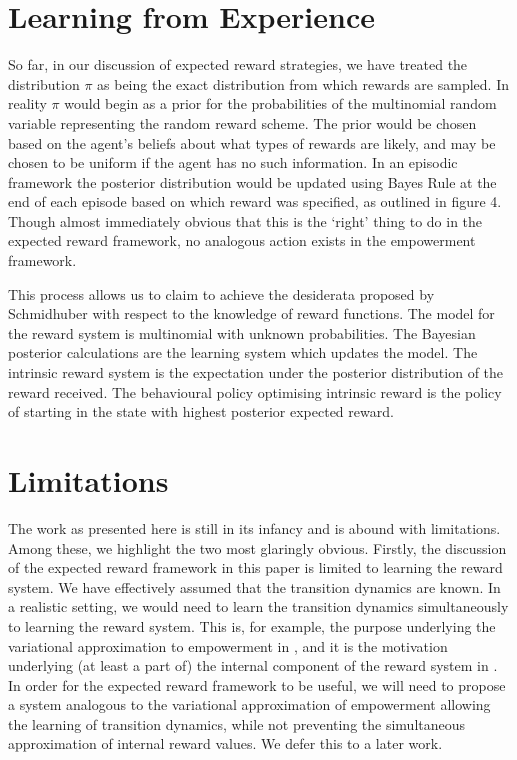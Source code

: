 \documentclass{article}
\begin{document}
\section{Learning from Experience}
So far, in our discussion of expected reward strategies, we have treated the distribution $\pi$ as being the exact distribution from which rewards are sampled. In reality $\pi$ would begin as a prior for the probabilities of the multinomial random variable representing the random reward scheme. The prior would be chosen based on the agent's beliefs about what types of rewards are likely, and may be chosen to be uniform if the agent has no such information. In an episodic framework the posterior distribution would be updated using Bayes Rule at the end of each episode based on which reward was specified, as outlined in figure 4. Though almost immediately obvious that this is the `right' thing to do in the expected reward framework, no analogous action exists in the empowerment framework. 

This process allows us to claim to achieve the desiderata proposed by Schmidhuber with respect to the knowledge of reward functions. The model for the reward system is multinomial with unknown probabilities. The Bayesian posterior calculations are the learning system which updates the model. The intrinsic reward system is the expectation under the posterior distribution of the reward received. The behavioural policy optimising intrinsic reward is the policy of starting in the state with highest posterior expected reward.

\section{Limitations}
The work as presented here is still in its infancy and is abound with limitations. Among these, we highlight the two most glaringly obvious. Firstly, the discussion of the expected reward framework in this paper is limited to learning the reward system. We have effectively assumed that the transition dynamics are known. In a realistic setting, we would need to learn the transition dynamics simultaneously to learning the reward system. This is, for example, the purpose underlying the variational approximation to empowerment in \cite{mohamed2015variational}, and it is the motivation underlying (at least a part of) the internal component of the reward system in \cite{schmidhuber2010formal}. In order for the expected reward framework to be useful, we will need to propose a system analogous to the variational approximation of empowerment allowing the learning of transition dynamics, while not preventing the simultaneous approximation of internal reward values. We defer this to a later work.
\end{document}

